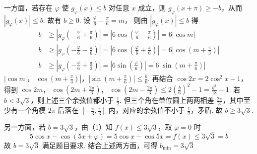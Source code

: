 \documentclass[UTF8,a4paper,oneside,11pt]{ctexbook}
\begin{document}
\begin{solution}
\begin{enumerate}
一方面，若存在 \(\varphi\) 使 \(g_\varphi(x)\le b\) 对任意 \(x\) 成立，则 \(g_\varphi(x+\pi)\ge -b\)，从而
\(|g_\varphi(x)|\le b\).
故有 \(b\ge 0\). 设
\(\frac{\varphi}{6}-\frac{\pi}{6}=m\)，
则由 \(|g_\varphi(x)|\le b\) 得
\begin{align*}
b&\ge \left|g_\varphi\left(-\frac{\varphi}{6}+\frac{\pi}{6}\right)\right| =\left|6\cos\left(\frac{\varphi}{6}-\frac{\pi}{6}\right)\right| =6|\cos m|\\
b&\ge \left|g_\varphi\left(-\frac{\varphi}{6}-\frac{\pi}{6}\right)\right| =\left|6\cos\left(\frac{\varphi}{6}+\frac{\pi}{6}\right)\right| =6\left|\cos\left(m+\frac{\pi}{3}\right)\right|\\
b&\ge \left|g_\varphi\left(-\frac{\varphi}{6}+\frac{\pi}{2}\right)\right| =\left|6\sin\left(\frac{\varphi}{6}\right)\right| =6\left|\sin\left(m+\frac{\pi}{6}\right)\right|
\end{align*}
\(|\cos m|\)，\(\left|\cos\left(m+\frac{\pi}{3}\right)\right|\)，\(\left|\sin\left(m+\frac{\pi}{6}\right)\right|\le \frac{b}{6}\).
再结合 \(\cos 2x = 2\cos^2 x - 1\)，得到
\(\cos 2m\)，\(\ \cos \left(2m+\frac{2\pi}{3}\right)\)，\(\ \cos \left(2m-\frac{2\pi}{3}\right)\le 2\left(\frac{b}{6}\right)^2-1=\frac{b^2}{18}-1\).
若 \(b<3\sqrt{3}\)，则上述三个余弦值都小于 \(\frac{1}{2}\). 但三个角在单位圆上两两相差 \(\frac{2\pi}{3}\)，其中至少有一个角模 \(2\pi\) 后落在 \(\left[-\frac{\pi}{3},\frac{\pi}{3}\right]\) 内，对应的余弦值不小于 \(\frac{1}{2}\)，矛盾. 故 \(b\ge 3\sqrt{3}\).

另一方面，若 \(b=3\sqrt{3}\)，由（1）知 \(f(x)\le 3\sqrt{3}\)，取 \(\varphi=0\) 时
\[
5\cos x-\cos (5x+\varphi)=5\cos x-\cos 5x=f(x)\le 3\sqrt{3}=b
\]
故 \(b=3\sqrt{3}\) 满足题目要求. 结合上述两方面，可得
\(
b_{\min}=3\sqrt{3}
\)
\end{enumerate}
\end{solution}

\end{document}
